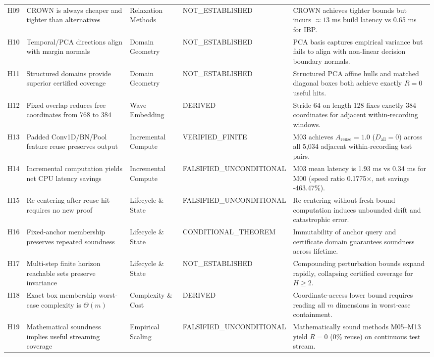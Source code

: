 \documentclass[10pt,twocolumn]{article}
\begin{document}
\begin{table}[t]
{\begin{tabular}{cllll}
H09 & CROWN is always cheaper and tighter than alternatives & Relaxation Methods & NOT\_ESTABLISHED & CROWN achieves tighter bounds but incurs $\approx 13$ ms build latency vs 0.65 ms for IBP. \\
H10 & Temporal/PCA directions align with margin normals & Domain Geometry & NOT\_ESTABLISHED & PCA basis captures empirical variance but fails to align with non-linear decision boundary normals. \\
H11 & Structured domains provide superior certified coverage & Domain Geometry & NOT\_ESTABLISHED & Structured PCA affine hulls and matched diagonal boxes both achieve exactly $R=0$ useful hits. \\
H12 & Fixed overlap reduces free coordinates from 768 to 384 & Wave Embedding & DERIVED & Stride 64 on length 128 fixes exactly 384 coordinates for adjacent within-recording windows. \\
H13 & Padded Conv1D/BN/Pool feature reuse preserves output & Incremental Compute & VERIFIED\_FINITE & M03 achieves $A_{\text{reuse}} = 1.0$ ($D_{\text{all}} = 0$) across all 5,034 adjacent within-recording test pairs. \\
H14 & Incremental computation yields net CPU latency savings & Incremental Compute & FALSIFIED\_UNCONDITIONAL & M03 mean latency is 1.93 ms vs 0.34 ms for M00 (speed ratio 0.1775$\times$, net savings -463.47\%). \\
H15 & Re-centering after reuse hit requires no new proof & Lifecycle \& State & FALSIFIED\_UNCONDITIONAL & Re-centering without fresh bound computation induces unbounded drift and catastrophic error. \\
H16 & Fixed-anchor membership preserves repeated soundness & Lifecycle \& State & CONDITIONAL\_THEOREM & Immutability of anchor query and certificate domain guarantees soundness across lifetime. \\
H17 & Multi-step finite horizon reachable sets preserve invariance & Lifecycle \& State & NOT\_ESTABLISHED & Compounding perturbation bounds expand rapidly, collapsing certified coverage for $H \ge 2$. \\
H18 & Exact box membership worst-case complexity is $\Theta(m)$ & Complexity \& Cost & DERIVED & Coordinate-access lower bound requires reading all $m$ dimensions in worst-case containment. \\
H19 & Mathematical soundness implies useful streaming coverage & Empirical Scaling & FALSIFIED\_UNCONDITIONAL & Mathematically sound methods M05--M13 yield $R=0$ (0\% reuse) on continuous test stream. \\

\end{tabular}}
\end{table}
\end{document}
